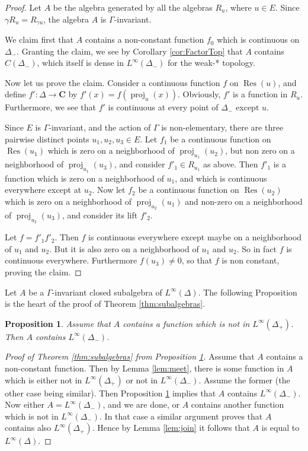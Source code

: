\documentclass[a4paper, 11pt]{article}
\theoremstyle{plain}
\newtheorem{proposition}{Proposition}[section]
\theoremstyle{definition}
\theoremstyle{remark}
\DeclareMathOperator{\proj}{proj}
\DeclareMathOperator{\Res}{Res}
\newcommand{\CC}{\mathbf{C}}                          %
\begin{document}
\begin{proof}
Let $A$ be the algebra generated by all the algebras $R_u$, where $u\in E$. Since $\gamma R_u=R_{\gamma u}$, the algebra $A$ is $\Gamma$-invariant. 

We claim first that $A$ contains a non-constant function $f_0$ which is continuous on $\Delta_-$. Granting the claim, we see by Corollary \ref{cor:FactorTop} that $A$ contains $C(\Delta_-)$, which itself is dense in $L^\infty(\Delta_-)$ for the weak-* topology.

Now let us prove the claim. Consider a continuous function $f$ on $\Res(u)$, and define $f':\Delta\to\CC$ by $f'(x)=f(\proj_u(x))$. Obviously, $f'$ is a function in $R_u$. Furthermore, we see that $f'$ is continuous at every point of $\Delta_-$ except $u$.

Since $E$ is $\Gamma$-invariant, and the action of $\Gamma$ is non-elementary, there are three pairwise distinct points $u_1, u_2, u_3\in E$. Let $f_1$ be a continuous function on $\Res(u_1)$ which is zero on a neighborhood of $\proj_{u_1}(u_2)$, but non zero on a neighborhood of $\proj_{u_1}(u_3)$, and consider $f'_1\in R_{u_1}$ as above. Then $f'_1$ is a function which is zero on a neighborhood of $u_1$, and which is continuous everywhere except at $u_2$. Now let $f_2$ be a continuous function on $\Res(u_2)$ which is zero on a neighborhood of $\proj_{u_2}(u_1)$ and non-zero on a neighborhood of $\proj_{u_2}(u_3)$, and consider its lift $f'_2$. 

Let $f=f'_1 f'_2$. Then $f$ is continuous everywhere except maybe on a neighborhood of $u_1$ and $u_2$. But it is also zero on a neighborhood of $u_1$ and $u_2$. So in fact $f$ is continuous everywhere. Furthermore $f(u_3)\neq 0$, so that $f$ is non constant, proving the claim.


\end{proof}


Let $A$ be a $\Gamma$-invariant closed subalgebra of $L^\infty(\Delta)$. The following Proposition is the heart of the proof of Theorem \ref{thm:subalgebras}.

\begin{proposition}\label{prop:radial}
Assume that $A$ contains a function which is not in $L^\infty(\Delta_+)$. Then $A$ contains $L^\infty(\Delta_-)$.
\end{proposition}

\begin{proof}[Proof of Theorem \ref{thm:subalgebras} from Proposition \ref{prop:radial}]

Assume that $A$ contains a non-constant function. Then by Lemma \ref{lem:meet}, there is some function in $A$ which is either not in $L^\infty(\Delta_+)$ or not in $L^\infty(\Delta_-)$. Assume the former (the other case being similar). Then Proposition \ref{prop:radial} implies that $A$ contains $L^\infty(\Delta_-)$. Now either $A=L^\infty(\Delta_-)$, and we are done, or $A$ contains another function which is not in $L^\infty(\Delta_-)$. In that case a similar argument proves that $A$ contains also $L^\infty(\Delta_+)$. Hence by Lemma \ref{lem:join} it follows that $A$ is equal to $L^\infty(\Delta)$.
\end{proof}
\end{document}
